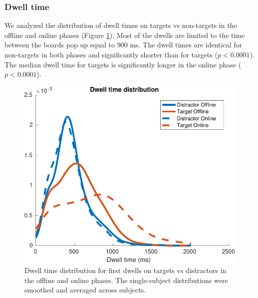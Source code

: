 \documentclass[12pt]{iopart}
\begin{document}
\subsubsection*{Dwell time}
We analyzed the distribution of dwell times on targets vs non-targets
in the offline and online phases (Figure \ref{fig:dwell}). 
Most of the dwells are limited to the time between the boards pop up equal to 900 ms.
The dwell times are identical for non-targets in both phases and significantly
shorter than for targets ($p < 0.0001$).
The median dwell time for targets is significantly longer in the online phase ($p < 0.0001$).

\begin{figure}[!t]
    \includegraphics[trim={0cm 0cm 0cm 0cm},clip,width=0.6\columnwidth]{../images/DwelltimeDist_online_allmean.pdf}
    \caption{Dwell time distribution for first dwells on
    targets vs distractors in the offline and online phases. The single-subject
    distributions were smoothed and averaged across subjects.}
\label{fig:dwell}
\end{figure}
\end{document}
